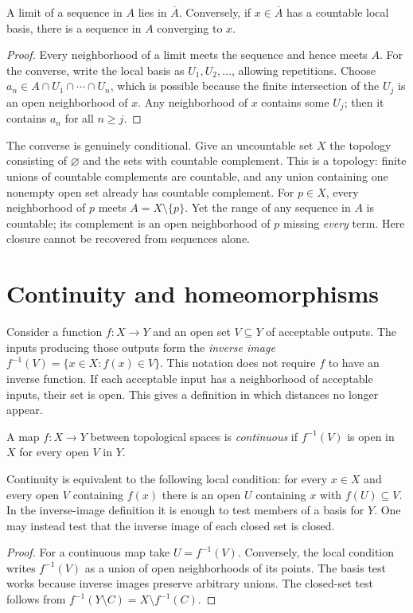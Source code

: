 \begin{proposition}\label{f:top-sequence-closure}
A limit of a sequence in $A$ lies in $\overline A$. Conversely, if $x\in\overline A$ has a countable local basis, there is a sequence in $A$ converging to $x$.
\end{proposition}
\begin{proof}
Every neighborhood of a limit meets the sequence and hence meets $A$. For the converse, write the local basis as $U_1,U_2,\ldots$, allowing repetitions. Choose $a_n\in A\cap U_1\cap\cdots\cap U_n$, which is possible because the finite intersection of the $U_j$ is an open neighborhood of $x$. Any neighborhood of $x$ contains some $U_j$; then it contains $a_n$ for all $n\geq j$.
\end{proof}

The converse is genuinely conditional. Give an uncountable set $X$ the topology consisting of $\varnothing$ and the sets with countable complement. This is a topology: finite unions of countable complements are countable, and any union containing one nonempty open set already has countable complement. For $p\in X$, every neighborhood of $p$ meets $A=X\setminus\{p\}$. Yet the range of any sequence in $A$ is countable; its complement is an open neighborhood of $p$ missing \emph{every} term. Here closure cannot be recovered from sequences alone.

\section{Continuity and homeomorphisms}

Consider a function $f:X\to Y$ and an open set $V\subseteq Y$ of acceptable outputs. The inputs producing those outputs form the \emph{inverse image} $f^{-1}(V)=\{x\in X:f(x)\in V\}$. This notation does not require $f$ to have an inverse function. If each acceptable input has a neighborhood of acceptable inputs, their set is open. This gives a definition in which distances no longer appear.

\begin{definition}\label{f:top-continuous-def}
A map $f:X\to Y$ between topological spaces is \emph{continuous} if $f^{-1}(V)$ is open in $X$ for every open $V$ in $Y$.
\end{definition}

\begin{proposition}\label{f:top-continuity}
Continuity is equivalent to the following local condition: for every $x\in X$ and every open $V$ containing $f(x)$ there is an open $U$ containing $x$ with $f(U)\subseteq V$. In the inverse-image definition it is enough to test members of a basis for $Y$. One may instead test that the inverse image of each closed set is closed.
\end{proposition}
\begin{proof}
For a continuous map take $U=f^{-1}(V)$. Conversely, the local condition writes $f^{-1}(V)$ as a union of open neighborhoods of its points. The basis test works because inverse images preserve arbitrary unions. The closed-set test follows from $f^{-1}(Y\setminus C)=X\setminus f^{-1}(C)$.
\end{proof}

